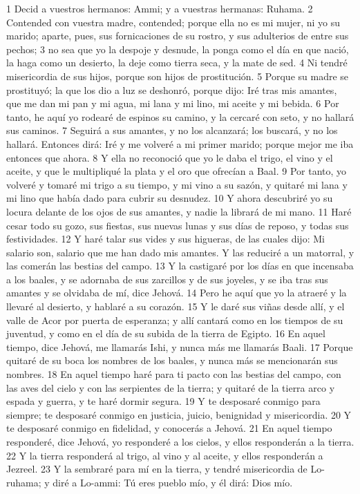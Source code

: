 1 Decid a vuestros hermanos: Ammi; y a vuestras hermanas: Ruhama.
2 Contended con vuestra madre, contended; porque ella no es mi mujer, ni yo su marido; aparte, pues, sus fornicaciones de su rostro, y sus adulterios de entre sus pechos;
3 no sea que yo la despoje y desnude, la ponga como el día en que nació, la haga como un desierto, la deje como tierra seca, y la mate de sed.
4 Ni tendré misericordia de sus hijos, porque son hijos de prostitución.
5 Porque su madre se prostituyó; la que los dio a luz se deshonró, porque dijo: Iré tras mis amantes, que me dan mi pan y mi agua, mi lana y mi lino, mi aceite y mi bebida.
6 Por tanto, he aquí yo rodearé de espinos su camino, y la cercaré con seto, y no hallará sus caminos.
7 Seguirá a sus amantes, y no los alcanzará; los buscará, y no los hallará. Entonces dirá: Iré y me volveré a mi primer marido; porque mejor me iba entonces que ahora.
8 Y ella no reconoció que yo le daba el trigo, el vino y el aceite, y que le multipliqué la plata y el oro que ofrecían a Baal.
9 Por tanto, yo volveré y tomaré mi trigo a su tiempo, y mi vino a su sazón, y quitaré mi lana y mi lino que había dado para cubrir su desnudez.
10 Y ahora descubriré yo su locura delante de los ojos de sus amantes, y nadie la librará de mi mano.
11 Haré cesar todo su gozo, sus fiestas, sus nuevas lunas y sus días de reposo, y todas sus festividades.
12 Y haré talar sus vides y sus higueras, de las cuales dijo: Mi salario son, salario que me han dado mis amantes. Y las reduciré a un matorral, y las comerán las bestias del campo.
13 Y la castigaré por los días en que incensaba a los baales, y se adornaba de sus zarcillos y de sus joyeles, y se iba tras sus amantes y se olvidaba de mí, dice Jehová.
14 Pero he aquí que yo la atraeré y la llevaré al desierto, y hablaré a su corazón.
15 Y le daré sus viñas desde allí, y el valle de Acor por puerta de esperanza; y allí cantará como en los tiempos de su juventud, y como en el día de su subida de la tierra de Egipto.
16 En aquel tiempo, dice Jehová, me llamarás Ishi, y nunca más me llamarás Baali.
17 Porque quitaré de su boca los nombres de los baales, y nunca más se mencionarán sus nombres.
18 En aquel tiempo haré para ti pacto con las bestias del campo, con las aves del cielo y con las serpientes de la tierra; y quitaré de la tierra arco y espada y guerra, y te haré dormir segura.
19 Y te desposaré conmigo para siempre; te desposaré conmigo en justicia, juicio, benignidad y misericordia.
20 Y te desposaré conmigo en fidelidad, y conocerás a Jehová.
21 En aquel tiempo responderé, dice Jehová, yo responderé a los cielos, y ellos responderán a la tierra.
22 Y la tierra responderá al trigo, al vino y al aceite, y ellos responderán a Jezreel.
23 Y la sembraré para mí en la tierra, y tendré misericordia de Lo-ruhama; y diré a Lo-ammi: Tú eres pueblo mío, y él dirá: Dios mío.

